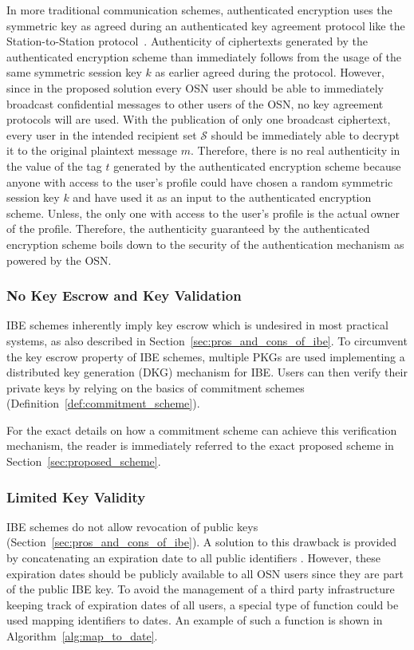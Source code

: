 In more traditional communication schemes, authenticated encryption uses the symmetric key as agreed during an authenticated key agreement protocol like the Station-to-Station protocol~\cite{art:DiffieOW92}. Authenticity of ciphertexts generated by the authenticated encryption scheme than immediately follows from the usage of the same symmetric session key $k$ as earlier agreed during the protocol. However, since in the proposed solution every OSN user should be able to immediately broadcast confidential messages to other users of the OSN, no key agreement protocols will are used. With the publication of only one broadcast ciphertext, every user in the intended recipient set $\mathcal{S}$ should be immediately able to decrypt it to the original plaintext message $m$. Therefore, there is no real authenticity in the value of the tag $t$ generated by the authenticated encryption scheme because anyone with access to the user's profile could have chosen a random symmetric session key $k$ and have used it as an input to the authenticated encryption scheme. Unless, the only one with access to the user's profile is the actual owner of the profile. Therefore, the authenticity guaranteed by the authenticated encryption scheme boils down to the security of the authentication mechanism as powered by the OSN.


\subsubsection{No Key Escrow and Key Validation}
IBE schemes inherently imply key escrow which is undesired in most practical systems, as also described in Section~\ref{sec:pros_and_cons_of_ibe}. To circumvent the key escrow property of IBE schemes, multiple PKGs are used implementing a distributed key generation (DKG) mechanism for IBE. Users can then verify their private keys by relying on the basics of commitment schemes (Definition~\ref{def:commitment_scheme}).

For the exact details on how a commitment scheme can achieve this verification mechanism, the reader is immediately referred to the exact proposed scheme in Section~\ref{sec:proposed_scheme}.

\subsubsection{Limited Key Validity}
IBE schemes do not allow revocation of public keys (Section~\ref{sec:pros_and_cons_of_ibe}). A solution to this drawback is provided by concatenating an expiration date to all public identifiers \id{}. However, these expiration dates should be publicly available to all OSN users since they are part of the public IBE key. To avoid the management of a third party infrastructure keeping track of expiration dates of all users, a special type of function could be used mapping identifiers \id{} to dates. An example of such a function is shown in Algorithm~\ref{alg:map_to_date}.

